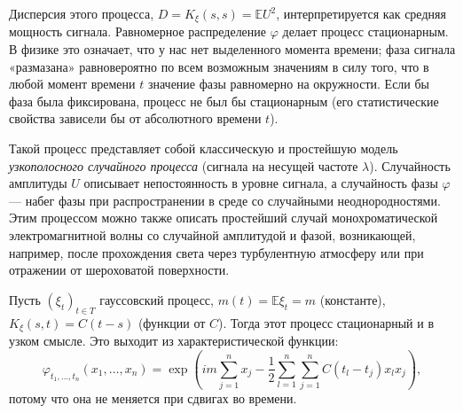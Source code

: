 \documentclass[10pt]{article}
\theoremstyle{boldnormal}
\newcommand{\EE}{{\ensuremath{\mathbb{E}}}}
\theoremstyle{boldremark}
\newenvironment{example}
  {\pushQED{\qed}\renewcommand{\qedsymbol}{$\triangle$}\examplex}
  {\popQED\endexamplex}
\begin{document}
\begin{example}
Дисперсия этого процесса, \(D=K_{\xi}(s,s)=\mathbb{E}U^2\),
интерпретируется как средняя мощность сигнала.
Равномерное распределение \(\varphi\) делает процесс стационарным.
В физике это означает, что у нас нет выделенного момента времени;
фаза сигнала «размазана» равновероятно по всем возможным значениям
в силу того, что в
любой момент времени \(t\) значение фазы равномерно на окружности.
Если бы фаза была фиксирована, процесс не был бы стационарным
(его статистические свойства зависели бы от абсолютного времени \(t\)).

Такой процесс  
    представляет собой классическую и простейшую
    модель \textit{узкополосного случайного процесса} (сигнала на несущей частоте \(\lambda\)). 
    Случайность амплитуды \(U\) описывает непостоянность
    в уровне сигнала, а случайность фазы \(\varphi\) — набег
    фазы при распространении в среде со случайными неоднородностями.
    Этим процессом можно также описать простейший случай
    монохроматической электромагнитной волны
    со случайной амплитудой и фазой,
    возникающей, например, после прохождения
    света через турбулентную атмосферу или при отражении от шероховатой поверхности.    
%
\end{example}

\begin{example}
    Пусть $(\xi_t)_{t \in T}$ гауссовский процесс,
$m(t) = \EE\xi_t = m$ (константе),
$K_\xi(s,t) = C(t-s)$ (функции от \(C\)).
Тогда этот процесс стационарный и в узком смысле.
Это выходит из характеристической функции:
$$
\varphi_{t_1, \dots, t_n}(x_1, \dots, x_n) 
= \exp \left( i m \sum_{j=1}^n x_j 
- \frac{1}{2} \sum_{l=1}^n \sum_{j=1}^n C(t_l-t_j) x_l x_j \right),
$$
потому что она не меняется при сдвигах во времени.
\end{example}
\end{document}

